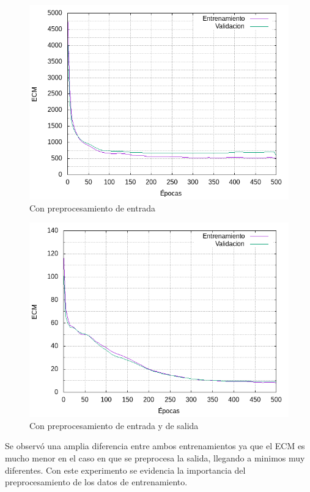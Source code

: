 \begin{figure}[h!]
  \includegraphics[width=125mm]{imagenes/ej2/ex_1-1_red-9-17-2_errors.png}
  \caption{Con preprocesamiento de entrada}
\end{figure}

\begin{figure}[h!]
  \includegraphics[width=125mm]{imagenes/ej2/ex_1-2_red-9-17-2_errors.png}
  \caption{Con preprocesamiento de entrada y de salida}
\end{figure}

Se observó una amplia diferencia entre ambos entrenamientos ya que el ECM es mucho menor en el caso en que se preprocesa la salida, llegando
a minimos muy diferentes. Con este experimento se evidencia la importancia del preprocesamiento de los datos de entrenamiento.

